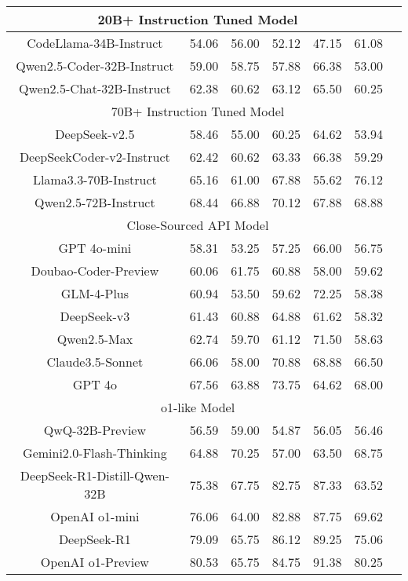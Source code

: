 \documentclass[11pt, a4paper, logo, copyright, nonumbering, amsart]{map}
\begin{document}
\begin{CJK*}{UTF8}{gbsn}
\begin{table*}[h!]
\begin{adjustbox}{width=0.8\textwidth}
\begin{tabular}{c|cccccc}
    \midrule
    \multicolumn{6}{c}{20B+ Instruction Tuned Model} \\
    \midrule
    CodeLlama-34B-Instruct & 54.06 & 56.00 & 52.12 & 47.15 & 61.08 \\
    Qwen2.5-Coder-32B-Instruct & 59.00 & 58.75 & 57.88 & 66.38 & 53.00 \\
    Qwen2.5-Chat-32B-Instruct & 62.38 & 60.62 & 63.12 & 65.50 & 60.25 \\

    \midrule
    \multicolumn{6}{c}{70B+ Instruction Tuned Model} \\
    \midrule
    DeepSeek-v2.5 & 58.46 & 55.00 & 60.25 & 64.62 & 53.94 \\
    DeepSeekCoder-v2-Instruct & 62.42 & 60.62 & 63.33 & 66.38 & 59.29 \\
    Llama3.3-70B-Instruct & 65.16 & 61.00 & 67.88 & 55.62 & 76.12 \\
    Qwen2.5-72B-Instruct & 68.44 & 66.88 & 70.12 & 67.88 & 68.88 \\

    \midrule
    \multicolumn{6}{c}{Close-Sourced API Model} \\
    \midrule
    GPT 4o-mini & 58.31 & 53.25 & 57.25 & 66.00 & 56.75 \\
    Doubao-Coder-Preview & 60.06 & 61.75 & 60.88 & 58.00 & 59.62 \\
    GLM-4-Plus & 60.94 & 53.50 & 59.62 & 72.25 & 58.38 \\
    DeepSeek-v3 & 61.43 & 60.88 & 64.88 & 61.62 & 58.32 \\
    Qwen2.5-Max & 62.74 & 59.70 & 61.12 & 71.50 & 58.63 \\
    Claude3.5-Sonnet & 66.06 & 58.00 & 70.88 & 68.88 & 66.50 \\
    GPT 4o & 67.56 & 63.88 & 73.75 & 64.62 & 68.00 \\
    
    \midrule
    \multicolumn{6}{c}{o1-like Model} \\
    \midrule
    QwQ-32B-Preview & 56.59 & 59.00 & 54.87 & 56.05 & 56.46 \\
    Gemini2.0-Flash-Thinking & 64.88 & 70.25 & 57.00 & 63.50 & 68.75 \\
    DeepSeek-R1-Distill-Qwen-32B & 75.38 & 67.75 & 82.75 & 87.33 & 63.52 \\
    OpenAI o1-mini & 76.06 & 64.00 & 82.88 & 87.75 & 69.62 \\
    DeepSeek-R1 & 79.09 & 65.75 & 86.12 & 89.25 & 75.06 \\
    OpenAI o1-Preview & 80.53 & 65.75 & 84.75 & 91.38 & 80.25 \\
    \bottomrule
    \end{tabular}
    \end{adjustbox}
\end{table*}


\end{CJK*}
\end{document}
